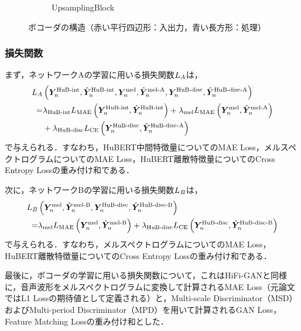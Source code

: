 \begin{figure}[tb]
\begin{subfigure}[b]{0.32\textwidth}
        \caption{UpsamplingBlock}
        \label{sec4:fig:vocoder_main_block}
    \end{subfigure}
    \caption{ボコーダの構造（赤い平行四辺形：入出力，青い長方形：処理）}
    \label{sec4:fig:vocoder}
\end{figure}

\subsubsection{損失関数}
まず，ネットワークAの学習に用いる損失関数$L_{A}$は，
\begin{equation}
    \begin{aligned}
        L_{A} & \left(\bm{Y}^{\text{HuB-int}}_{n}, \hat{\bm{Y}}^{\text{HuB-int}}_{n}, \bm{Y}^{\text{mel}}_{n}, \hat{\bm{Y}}^{\text{mel-A}}_{n}, \bm{Y}^{\text{HuB-disc}}_{n}, \hat{\bm{Y}}^{\text{HuB-disc-A}}_{n}\right)                 \\
        =      & \lambda_{\text{HuB-int}} L_{\text{MAE}}\left(\bm{Y}^{\text{HuB-int}}_{n}, \hat{\bm{Y}}^{\text{HuB-int}}_{n}\right) + \lambda_{\text{mel}} L_{\text{MAE}}\left(\bm{Y}^{\text{mel}}_{n}, \hat{\bm{Y}}^{\text{mel-A}}_{n}\right) \\
               & + \lambda_{\text{HuB-disc}} L_{\text{CE}}\left(\bm{Y}^{\text{HuB-disc}}_{n}, \hat{\bm{Y}}^{\text{HuB-disc-A}}_{n}\right)
    \end{aligned}
\end{equation}
で与えられる．すなわち，HuBERT中間特徴量についてのMAE Loss，メルスペクトログラムについてのMAE Loss，HuBERT離散特徴量についてのCross Entropy Lossの重み付け和である．

次に，ネットワークBの学習に用いる損失関数$L_{B}$は，
\begin{equation}
    \begin{aligned}
        L_{B} & \left(\bm{Y}^{\text{mel}}_{n}, \hat{\bm{Y}}^{\text{mel-B}}_{n}, \bm{Y}^{\text{HuB-disc}}_{n}, \hat{\bm{Y}}^{\text{HuB-disc-B}}_{n}\right)                                                  \\
        =      & \lambda_{\text{mel}} L_{\text{MAE}}\left(\bm{Y}^{\text{mel}}_{n}, \hat{\bm{Y}}^{\text{mel-B}}_{n}\right) + \lambda_{\text{HuB-disc}} L_{\text{CE}}\left(\bm{Y}^{\text{HuB-disc}}_{n}, \hat{\bm{Y}}^{\text{HuB-disc-B}}_{n}\right)
    \end{aligned}
\end{equation}
で与えられる．すなわち，メルスペクトログラムについてのMAE Loss，HuBERT離散特徴量についてのCross Entropy Lossの重み付け和である．

最後に，ボコーダの学習に用いる損失関数について，これはHiFi-GANと同様に，音声波形をメルスペクトログラムに変換して計算されるMAE Loss（元論文ではL1 Lossの期待値として定義される）と，Multi-scale Discriminator（MSD）およびMulti-period Discriminator（MPD）を用いて計算されるGAN Loss，Feature Matching Lossの重み付け和とした．